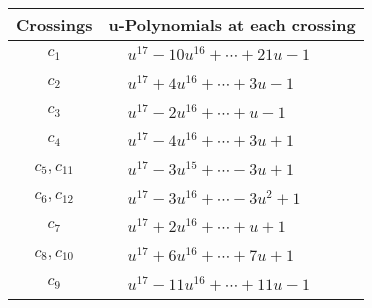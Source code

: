 \documentclass[1p]{elsarticle_modified}
\theoremstyle{definition}
\begin{document}
\begin{tabular}{m{50pt}|m{274pt}}
Crossings & \hspace{64pt}u-Polynomials at each crossing \\
\hline $$\begin{aligned}c_{1}\end{aligned}$$&$\begin{aligned}
&u^{17}-10 u^{16}+\cdots+21 u-1
\end{aligned}$\\
\hline $$\begin{aligned}c_{2}\end{aligned}$$&$\begin{aligned}
&u^{17}+4 u^{16}+\cdots+3 u-1
\end{aligned}$\\
\hline $$\begin{aligned}c_{3}\end{aligned}$$&$\begin{aligned}
&u^{17}-2 u^{16}+\cdots+u-1
\end{aligned}$\\
\hline $$\begin{aligned}c_{4}\end{aligned}$$&$\begin{aligned}
&u^{17}-4 u^{16}+\cdots+3 u+1
\end{aligned}$\\
\hline $$\begin{aligned}c_{5},c_{11}\end{aligned}$$&$\begin{aligned}
&u^{17}-3 u^{15}+\cdots-3 u+1
\end{aligned}$\\
\hline $$\begin{aligned}c_{6},c_{12}\end{aligned}$$&$\begin{aligned}
&u^{17}-3 u^{16}+\cdots-3 u^2+1
\end{aligned}$\\
\hline $$\begin{aligned}c_{7}\end{aligned}$$&$\begin{aligned}
&u^{17}+2 u^{16}+\cdots+u+1
\end{aligned}$\\
\hline $$\begin{aligned}c_{8},c_{10}\end{aligned}$$&$\begin{aligned}
&u^{17}+6 u^{16}+\cdots+7 u+1
\end{aligned}$\\
\hline $$\begin{aligned}c_{9}\end{aligned}$$&$\begin{aligned}
&u^{17}-11 u^{16}+\cdots+11 u-1
\end{aligned}$\\
\hline
\end{tabular}\\~\\
\end{document}
